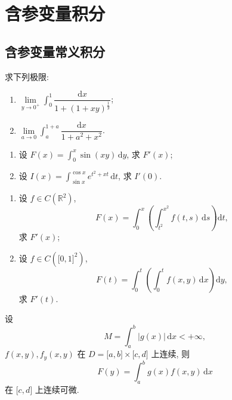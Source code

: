 \documentclass[../数学分析培优讲义.tex]{subfiles}
\begin{document}
\setcounter{chapter}{10}
\pagestyle{fancy}

\chapter{含参变量积分}


\section{含参变量常义积分}

\begin{example}
求下列极限:
\begin{enumerate}[label=(\arabic*)]
    \item $\displaystyle \lim\limits_{y\to0^+}\int_0^1\dfrac{\mathrm{d}x}{1+(1+xy)^{\frac{1}{y}}}$;
    \item $\displaystyle \lim\limits_{a\to0}\int_a^{1+a}\dfrac{\mathrm{d}x}{1+a^2+x^2}$.
\end{enumerate}
\end{example}
\exampleblank

\begin{example}
\begin{enumerate}[label=(\arabic*)]
    \item 设 $F(x)=\displaystyle\int_0^x\sin(xy)\,\mathrm{d}y$, 求 $F'(x)$;
    \item 设 $I(x)=\displaystyle\int_{\sin x}^{\cos x}e^{t^2+xt}\,\mathrm{d}t$, 求 $I'(0)$.
\end{enumerate}
\end{example}
\exampleblank

\begin{example}
\begin{enumerate}[label=(\arabic*)]
    \item 设 $f\in C(\mathbb{R}^2)$,
    \[
        F(x)=\int_0^x\left(\int_{t^2}^{x^2}f(t,s)\,\mathrm{d}s\right)\mathrm{d}t,
    \]
    求 $F'(x)$;
    \item 设 $f\in C(\lbrack0,1\rbrack^2)$,
    \[
        F(t)=\int_0^t\left(\int_0^t f(x,y)\,\mathrm{d}x\right)\mathrm{d}y,
    \]
    求 $F'(t)$.
\end{enumerate}
\end{example}
\exampleblank

\begin{example}
设
\[
    M=\int_a^b|g(x)|\,\mathrm{d}x<+\infty,
\]
$f(x,y),f_y(x,y)$ 在 $D=\lbrack a,b\rbrack\times\lbrack c,d\rbrack$ 上连续, 则
\[
    F(y)=\int_a^b g(x)f(x,y)\,\mathrm{d}x
\]
在 $\lbrack c,d\rbrack$ 上连续可微.
\end{example}
\exampleblank
\end{document}

